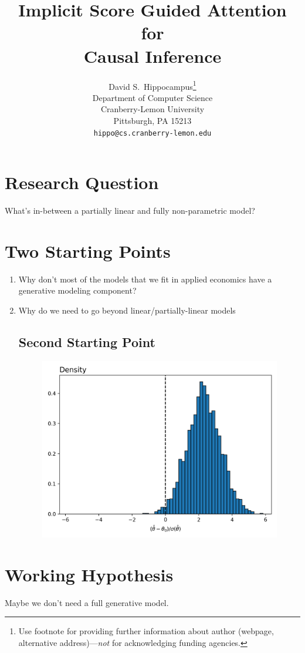 \documentclass{article}
\title{Implicit Score Guided Attention for \\ Causal Inference}
\author{%
  David S.~Hippocampus\thanks{Use footnote for providing further information
    about author (webpage, alternative address)---\emph{not} for acknowledging
    funding agencies.} \\
  Department of Computer Science\\
  Cranberry-Lemon University\\
  Pittsburgh, PA 15213 \\
  \texttt{hippo@cs.cranberry-lemon.edu} \\
}
\begin{document}
\maketitle


 


\section{Research Question}
What's in-between a partially linear and fully non-parametric model?


\section{Two Starting Points}
\begin{enumerate}
    \item Why don't most of the models that we fit in applied economics have a generative modeling component? 
    \item Why do we need to go beyond linear/partially-linear models
    
\subsection{Second Starting Point}
\begin{figure}[htbp]
\centering
\includegraphics[scale=0.5]{examples/dml.png}
\label{fig:nonparametrics}
\end{figure}
\end{enumerate}


\section{Working Hypothesis}
Maybe we don't need a full generative model.
\end{document}
